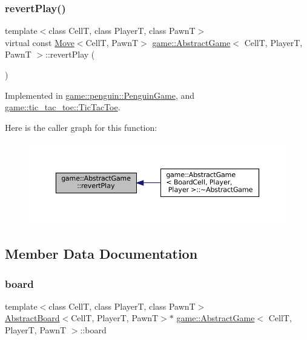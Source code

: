 \subsubsection{\texorpdfstring{revert\+Play()}{revertPlay()}}
{\footnotesize\ttfamily template$<$class CellT, class PlayerT, class PawnT$>$ \\
virtual const \hyperlink{structgame_1_1_move}{Move}$<$CellT, PawnT$>$ \hyperlink{classgame_1_1_abstract_game}{game\+::\+Abstract\+Game}$<$ CellT, PlayerT, PawnT $>$\+::revert\+Play (\begin{DoxyParamCaption}{ }\end{DoxyParamCaption})\hspace{0.3cm}{\ttfamily [pure virtual]}}



Implemented in \hyperlink{classgame_1_1penguin_1_1_penguin_game_a16aabdfdf43ad7b5b417b58eb593e063}{game\+::penguin\+::\+Penguin\+Game}, and \hyperlink{classgame_1_1tic__tac__toe_1_1_tic_tac_toe_a38a848001838eb4ccbafa9800f3cbfd4}{game\+::tic\+\_\+tac\+\_\+toe\+::\+Tic\+Tac\+Toe}.

Here is the caller graph for this function\+:
\nopagebreak
\begin{figure}[H]
\begin{center}
\leavevmode
\includegraphics[width=350pt]{classgame_1_1_abstract_game_af6088ae12ed47989dde7f8869e79d934_icgraph}
\end{center}
\end{figure}


\subsection{Member Data Documentation}
\mbox{\label{classgame_1_1_abstract_game_a6df5f611daa1731c4c8d3d5e6289e7e5}} 
\subsubsection{\texorpdfstring{board}{board}}
{\footnotesize\ttfamily template$<$class CellT, class PlayerT, class PawnT$>$ \\
\hyperlink{classgame_1_1_abstract_board}{Abstract\+Board}$<$CellT, PlayerT, PawnT$>$$\ast$ \hyperlink{classgame_1_1_abstract_game}{game\+::\+Abstract\+Game}$<$ CellT, PlayerT, PawnT $>$\+::board}



